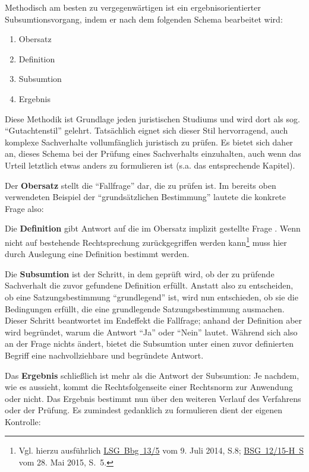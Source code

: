 Methodisch am besten zu vergegenwärtigen ist ein ergebnisorientierter Subsumtionsvorgang, indem er nach dem folgenden Schema bearbeitet wird:
\begin{enumerate}
\item Obersatz
\item Definition
\item Subsumtion
\item Ergebnis
\end{enumerate}

Diese Methodik ist Grundlage jeden juristischen Studiums und wird dort als sog. \enquote{Gutachtenstil} gelehrt. Tatsächlich eignet sich dieser Stil hervorragend, auch komplexe Sachverhalte vollumfänglich juristisch zu prüfen. Es bietet sich daher an, dieses Schema bei der Prüfung eines Sachverhalts einzuhalten, auch wenn das Urteil letztlich etwas anders zu formulieren ist (s.a. das entsprechende Kapitel).

Der \textbf{Obersatz} stellt die \enquote{Fallfrage} dar, die zu prüfen ist. Im bereits oben verwendeten Beispiel der \enquote{grundsätzlichen Bestimmung} lautete die konkrete Frage also: 

Die \textbf{Definition} gibt Antwort auf die im Obersatz implizit gestellte Frage . Wenn nicht auf bestehende Rechtsprechung zurückgegriffen werden kann\footnote{Vgl. hierzu ausführlich \href{https://wiki.piratenbrandenburg.de/images/f/f2/LSG-Bbg-13-5\_Urteil\_2014\_07\_09.pdf}{LSG~Bbg~13/5} vom 9. Juli 2014, S.8; \href{http://piraten-bsg.de/git/BSG\%2012-15-H\%20S.pdf}{BSG~12/15-H~S} vom 28. Mai 2015, S.~5.} muss hier durch Auslegung eine Definition bestimmt werden.

Die \textbf{Subsumtion} ist der Schritt, in dem geprüft wird, ob der zu prüfende Sachverhalt die zuvor gefundene Definition erfüllt. Anstatt also zu entscheiden, ob eine Satzungsbestimmung \enquote{grundlegend} ist, wird nun entschieden, ob sie die Bedingungen erfüllt, die eine grundlegende Satzungsbestimmung ausmachen. Dieser Schritt beantwortet im Endeffekt die Fallfrage; anhand der Definition aber wird begründet, warum die Antwort \enquote{Ja} oder \enquote{Nein} lautet. Während sich also an der Frage nichts ändert, bietet die Subsumtion unter einen zuvor definierten Begriff eine nachvollziehbare und begründete Antwort.

Das \textbf{Ergebnis} schließlich ist mehr als die Antwort der Subsumtion: Je nachdem, wie es aussieht, kommt die Rechtsfolgenseite einer Rechtsnorm zur Anwendung oder nicht. Das Ergebnis bestimmt nun über den weiteren Verlauf des Verfahrens oder der Prüfung. Es zumindest gedanklich zu formulieren dient der eigenen Kontrolle: 

